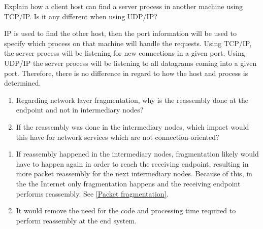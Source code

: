 \begin{Exercise}
Explain how a client host can find a server process in another machine using TCP/IP. Is it any different when using UDP/IP?
\end{Exercise}
\begin{Answer}
IP is used to find the other host, then the port information will be used to specify which process on that machine will handle the requests.
Using TCP/IP, the server process will be listening for new connections in a given port. Using UDP/IP the server process will be listening to all datagrams coming into a given port.
Therefore, there is no difference in regard to how the host and process is determined.
\end{Answer}

\begin{Exercise}
\begin{enumerate}
\item Regarding network layer fragmentation, why is the reassembly done at the endpoint and not in intermediary nodes?
\item If the reassembly was done in the intermediary nodes, which impact would this have for network services which are not connection-oriented?
\end{enumerate}
\end{Exercise}
\begin{Answer}
\begin{enumerate}
\item If reassembly happened in the intermediary nodes, fragmentation likely would have to happen again in order to reach the receiving endpoint, resulting in more packet reassembly for the next intermediary nodes. Because of this, in the the Internet only fragmentation happens and the receiving endpoint performs reassembly. See \ref{Packet fragmentation}.
\item It would remove the need for the code and processing time required to perform reassembly at the end system.
\end{enumerate}
\end{Answer}


